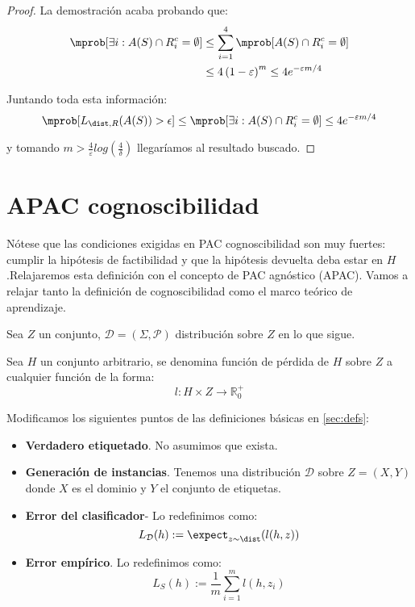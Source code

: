 \begin{example}
\begin{proof}
    La demostración acaba probando que:
    \begin{align*}
    \mprob [\exists i : A(S)\cap R_i^c = \emptyset] &\le \sum_{i=1}^4 \mprob[A(S)\cap R_i^c = \emptyset] \\
                                                    &\le 4 \left(1-\varepsilon \right)^m \le 4e^{-\varepsilon m/4}
    \end{align*}

    Juntando toda esta información: 
    \[
      \mprob[L_{\dist,R}(A(S)) > \epsilon] \le \mprob [\exists i : A(S)\cap R_i^c = \emptyset] \le 4e^{-\varepsilon m/4}
    \]
                                    
    y tomando $m > \frac{4}{\varepsilon} log \left( \frac{4}{\delta} \right)$ llegaríamos al resultado buscado.
    \end{proof}
\end{example}

\section{APAC cognoscibilidad}

Nótese que las condiciones exigidas en PAC cognoscibilidad son muy fuertes: cumplir la hipótesis de factibilidad y que 
la hipótesis devuelta deba estar en $H$.Relajaremos esta definición con el concepto de PAC agnóstico (APAC).
Vamos a relajar tanto la definición de cognoscibilidad como el marco teórico de aprendizaje.

Sea $Z$ un conjunto, $\mathcal{D} = (\Sigma, \mathcal{P})$ distribución sobre $Z$ en lo que sigue.

\begin{definition}
Sea $H$ un conjunto arbitrario, se denomina función de pérdida de $H$ sobre $Z$ a cualquier función de la 
forma:
\[
  l : H \times Z \rightarrow \mathbb{R}_0^{+}
\]
\end{definition}

Modificamos los siguientes puntos de las definiciones básicas en \ref{sec:defs}:

\begin{itemize}
  \item \textbf{Verdadero etiquetado}. No asumimos que exista.
  \item \textbf{Generación de instancias}. Tenemos una distribución $\mathcal{D}$ sobre $Z = (X,Y)$ donde $X$ es el dominio
  y $Y$ el conjunto de etiquetas.
  \item \textbf{Error del clasificador}- Lo redefinimos como:
  \[
    L_{\mathcal{D}}(h) :=  \expect_{z\sim \dist} (l(h,z))
  \]  
  \item \textbf{Error empírico}. Lo redefinimos como:
  \[L_{S} (h) := \frac{1}{m} \sum_{i=1}^m l(h,z_i)\]
\end{itemize}

